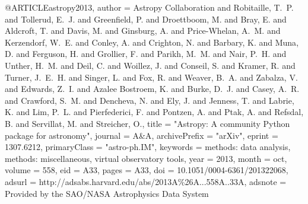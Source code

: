 @ARTICLE{astropy2013,
   author = {{Astropy Collaboration} and {Robitaille}, T.~P. and {Tollerud}, E.~J. and
	{Greenfield}, P. and {Droettboom}, M. and {Bray}, E. and {Aldcroft}, T. and
	{Davis}, M. and {Ginsburg}, A. and {Price-Whelan}, A.~M. and
	{Kerzendorf}, W.~E. and {Conley}, A. and {Crighton}, N. and
	{Barbary}, K. and {Muna}, D. and {Ferguson}, H. and {Grollier}, F. and
	{Parikh}, M.~M. and {Nair}, P.~H. and {Unther}, H.~M. and {Deil}, C. and
	{Woillez}, J. and {Conseil}, S. and {Kramer}, R. and {Turner}, J.~E.~H. and
	{Singer}, L. and {Fox}, R. and {Weaver}, B.~A. and {Zabalza}, V. and
	{Edwards}, Z.~I. and {Azalee Bostroem}, K. and {Burke}, D.~J. and
	{Casey}, A.~R. and {Crawford}, S.~M. and {Dencheva}, N. and
	{Ely}, J. and {Jenness}, T. and {Labrie}, K. and {Lim}, P.~L. and
	{Pierfederici}, F. and {Pontzen}, A. and {Ptak}, A. and {Refsdal}, B. and
	{Servillat}, M. and {Streicher}, O.},
    title = "{Astropy: A community Python package for astronomy}",
  journal = {A\&A},
archivePrefix = "arXiv",
   eprint = {1307.6212},
 primaryClass = "astro-ph.IM",
 keywords = {methods: data analysis, methods: miscellaneous, virtual observatory tools},
     year = 2013,
    month = oct,
   volume = 558,
      eid = {A33},
    pages = {A33},
      doi = {10.1051/0004-6361/201322068},
   adsurl = {http://adsabs.harvard.edu/abs/2013A\%26A...558A..33A},
  adsnote = {Provided by the SAO/NASA Astrophysics Data System}
}
